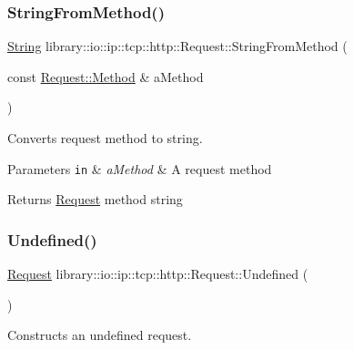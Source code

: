 \subsubsection{\texorpdfstring{String\+From\+Method()}{StringFromMethod()}}
{\footnotesize\ttfamily \hyperlink{namespacelibrary_1_1io_1_1ip_1_1tcp_1_1http_a1c435ea1e3614d52139da88a36632815}{String} library\+::io\+::ip\+::tcp\+::http\+::\+Request\+::\+String\+From\+Method (\begin{DoxyParamCaption}\item[{const \hyperlink{classlibrary_1_1io_1_1ip_1_1tcp_1_1http_1_1_request_a45baccf3aec384fbdbbf6ce411f11bd7}{Request\+::\+Method} \&}]{a\+Method }\end{DoxyParamCaption})\hspace{0.3cm}{\ttfamily [static]}}



Converts request method to string. 


\begin{DoxyParams}[1]{Parameters}
\mbox{\tt in}  & {\em a\+Method} & A request method \\
\hline
\end{DoxyParams}
\begin{DoxyReturn}{Returns}
\hyperlink{classlibrary_1_1io_1_1ip_1_1tcp_1_1http_1_1_request}{Request} method string 
\end{DoxyReturn}
\mbox{\label{classlibrary_1_1io_1_1ip_1_1tcp_1_1http_1_1_request_afec9045c3213a45ac267b332ba88cad0}} 
\subsubsection{\texorpdfstring{Undefined()}{Undefined()}}
{\footnotesize\ttfamily \hyperlink{classlibrary_1_1io_1_1ip_1_1tcp_1_1http_1_1_request}{Request} library\+::io\+::ip\+::tcp\+::http\+::\+Request\+::\+Undefined (\begin{DoxyParamCaption}{ }\end{DoxyParamCaption})\hspace{0.3cm}{\ttfamily [static]}}



Constructs an undefined request. 

